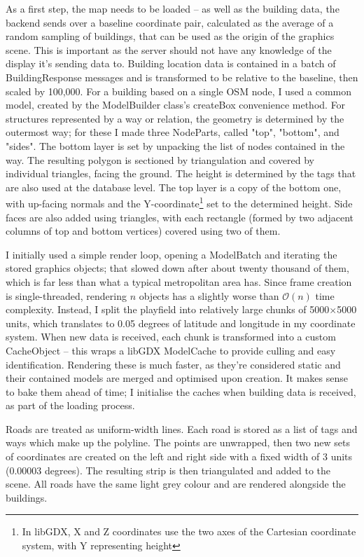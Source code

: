 As a first step, the map needs to be loaded -- as well as the building data, the backend sends over a baseline coordinate pair, calculated as the average of a random sampling of buildings, that can be used as the origin of the graphics scene. This is important as the server should not have any knowledge of the display it's sending data to. Building location data is contained in a batch of BuildingResponse messages and is transformed to be relative to the baseline, then scaled by 100,000. For a building based on a single OSM node, I used a common model, created by the ModelBuilder class's createBox convenience method. For structures represented by a way or relation, the geometry is determined by the outermost way; for these I made three NodeParts, called "top", "bottom", and "sides". The bottom layer is set by unpacking the list of nodes contained in the way. The resulting polygon is sectioned by triangulation and covered by individual triangles, facing the ground. The height is determined by the tags that are also used at the database level. The top layer is a copy of the bottom one, with up-facing normals and the Y-coordinate\footnote{In libGDX, X and Z coordinates use the two axes of the Cartesian coordinate system, with Y representing height} set to the determined height. Side faces are also added using triangles, with each rectangle (formed by two adjacent columns of top and bottom vertices) covered using two of them.

I initially used a simple render loop, opening a ModelBatch and iterating the stored graphics objects; that slowed down after about twenty thousand of them, which is far less than what a typical metropolitan area has. Since frame creation is single-threaded, rendering $n$ objects has a slightly worse than $\mathcal{O}(n)$ time complexity. Instead, I split the playfield into relatively large chunks of 5000$\times$5000 units, which translates to 0.05 degrees of latitude and longitude in my coordinate system. When new data is received, each chunk is transformed into a custom CacheObject -- this wraps a libGDX ModelCache to provide culling and easy identification. Rendering these is much faster, as they're considered static and their contained models are merged and optimised upon creation.\cite{LibgdxModelCache} It makes sense to bake them ahead of time; I initialise the caches when building data is received, as part of the loading process.

Roads are treated as uniform-width lines. Each road is stored as a list of tags and ways which make up the polyline. The points are unwrapped, then two new sets of coordinates are created on the left and right side with a fixed width of 3 units (0.00003 degrees). The resulting strip is then triangulated and added to the scene. All roads have the same light grey colour and are rendered alongside the buildings.

